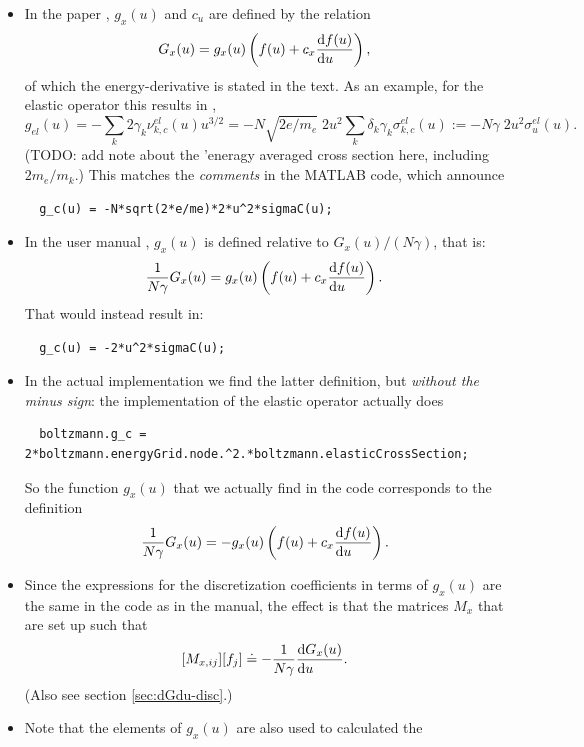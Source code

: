 \documentclass{book}
\begin{document}
\begin{itemize}
  \item In the paper \cite[eqn. 15d]{Tejero2019}, $g_x(u)$ and $c_u$ are defined
        by the relation
        \[
          G_x(u) = g_x(u)\left(f(u)+c_x\DERIV{f(u)}{u}\right),
        \]
        of which the energy-derivative is stated in the text. As an example,
        for the elastic operator this results in \cite[eqn. 6b]{Tejero2019},
        \[
           g_{el}(u)=-\sum\limits_k 2\gamma_k\nu^{el}_{k,c}(u)u^{3/2}
           = -N\sqrt{2e/m_e}\;2u^2\sum\limits_k \delta_k\gamma_k\sigma^{el}_{k,c}(u)
           := -N\gamma\;2u^2\sigma^{el}_u(u).
        \]
        (TODO: add note about the 'eneragy averaged cross section here, including $2m_e/m_k$.)
        This matches the {\em comments} in the MATLAB code, which announce
\begin{lstlisting}
  g_c(u) = -N*sqrt(2*e/me)*2*u^2*sigmaC(u);
\end{lstlisting}
  \item In the user manual \cite[eqn. 16d]{Tejero2019}, $g_x(u)$ is defined
        relative to $G_x(u)/(N\gamma)$, that is:
        \begin{equation}
          \frac{1}{N\gamma}G_x(u) = g_x(u)\left(f(u)+c_x\DERIV{f(u)}{u}\right).
          \label{eq:G(g)}
        \end{equation}
        That would instead result in:
\begin{lstlisting}
  g_c(u) = -2*u^2*sigmaC(u);
\end{lstlisting}
  \item In the actual implementation we find the latter definition, but {\em without
        the minus sign}: the implementation of the elastic operator actually does
\begin{lstlisting}
  boltzmann.g_c = 2*boltzmann.energyGrid.node.^2.*boltzmann.elasticCrossSection;
\end{lstlisting}
        So the function $g_x(u)$ that we actually find in the code corresponds to the definition
        \[
          \frac{1}{N\gamma}G_x(u) = -g_x(u)\left(f(u)+c_x\DERIV{f(u)}{u}\right).
        \]
  \item Since the expressions for the discretization coefficients in terms of
        $g_x(u)$ are the same in the code as in the manual, the effect is that
        the matrices $M_x$ that are set up such that
        \[
           [M_{x,ij}][f_j] \doteq -\frac{1}{N\gamma}\DERIV{G_x(u)}{u}.
        \]
        (Also see section \ref{sec:dGdu-disc}.)
  \item Note that the elements of $g_x(u)$ are also used to calculated the

\end{itemize}
\end{document}
